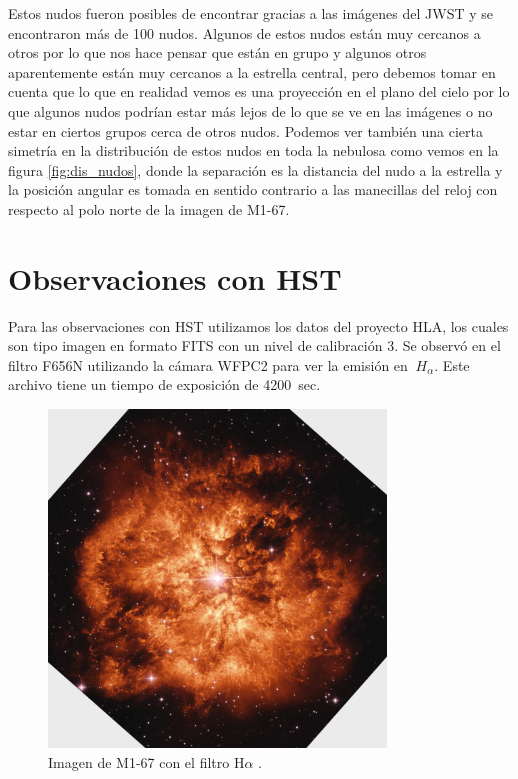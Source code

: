 \documentclass{book}
\begin{document}
Estos nudos fueron posibles de encontrar gracias a las imágenes del JWST y se encontraron más de 100 nudos. Algunos de estos nudos están muy cercanos a otros por lo que nos hace pensar que están en grupo y algunos otros aparentemente están muy cercanos a la estrella central, pero debemos tomar en cuenta que lo que en realidad vemos es una proyección en el plano del cielo por lo que algunos nudos podrían estar más lejos de lo que se ve en las imágenes o no estar en ciertos grupos cerca de otros nudos. Podemos ver también una cierta simetría en la distribución de estos nudos en toda la nebulosa como vemos en la figura \ref{fig:dis_nudos}, donde la separación es la distancia del nudo a la estrella y la posición angular es tomada en sentido contrario a las manecillas del reloj con respecto al polo norte de la imagen de M1-67.

\section{Observaciones con HST}

Para las observaciones con HST utilizamos los datos del proyecto HLA, los cuales son tipo imagen en formato FITS con un nivel de calibración 3.  Se observó en el filtro F656N utilizando la cámara WFPC2 para ver la emisión en $\SI{}{H_\alpha}$. Este archivo tiene un tiempo de exposición de \SI{4200}{sec}.  

\begin{figure}[h]
    \centering
    \includegraphics[width=0.8\textwidth]{m1-67-comp-full-hst.jpg}
    \caption{Imagen de M1-67 con el filtro H$\alpha$ .}
    \label{fig:M1-67HST}
\end{figure}
\end{document}
